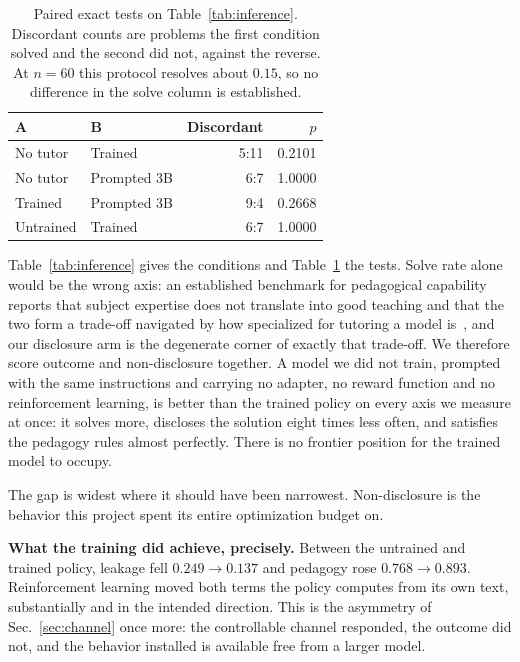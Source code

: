 \documentclass[conference]{IEEEtran}
\begin{document}
\begin{table}[t]
\caption{Paired exact tests on Table~\ref{tab:inference}. Discordant counts are
problems the first condition solved and the second did not, against the
reverse. At $n{=}60$ this protocol resolves about $0.15$, so no difference in
the solve column is established.}
\label{tab:inferencestats}
\centering
\small
\begin{tabular}{llrr}
\toprule
\textbf{A} & \textbf{B} & \textbf{Discordant} & \textbf{$p$} \\
\midrule
No tutor  & Trained      & 5:11 & 0.2101 \\
No tutor  & Prompted 3B  & 6:7  & 1.0000 \\
Trained   & Prompted 3B  & 9:4  & 0.2668 \\
Untrained & Trained      & 6:7  & 1.0000 \\
\bottomrule
\end{tabular}
\end{table}

Table~\ref{tab:inference} gives the conditions and
Table~\ref{tab:inferencestats} the tests. Solve rate alone would be the
wrong axis: an established benchmark for pedagogical capability reports that
subject expertise does not translate into good teaching and that the two form a
trade-off navigated by how specialized for tutoring a model
is~\cite{mathtutorbench}, and our disclosure arm is the degenerate corner of
exactly that trade-off. We therefore score outcome and non-disclosure together.
A model we did not train, prompted with the same instructions and carrying no
adapter, no reward function and no reinforcement learning, is better than the
trained policy on every axis we measure at once: it solves more, discloses the solution eight times less often,
and satisfies the pedagogy rules almost perfectly. There is no frontier
position for the trained model to occupy.

The gap is widest where it should have been narrowest. Non-disclosure is the
behavior this project spent its entire optimization budget on.

\textbf{What the training did achieve, precisely.} Between the untrained and
trained policy, leakage fell $0.249 \rightarrow 0.137$ and pedagogy rose
$0.768 \rightarrow 0.893$. Reinforcement learning moved both terms the policy
computes from its own text, substantially and in the intended direction. This
is the asymmetry of Sec.~\ref{sec:channel} once more: the controllable channel
responded, the outcome did not, and the behavior installed is available free
from a larger model.
\end{document}
